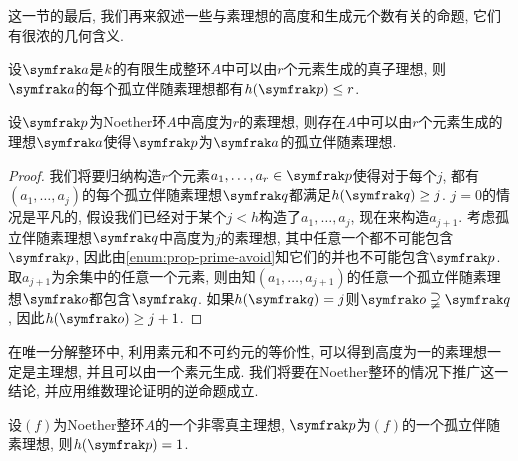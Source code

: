 
这一节的最后, 我们再来叙述一些与素理想的高度和生成元个数有关的命题, 它们有很浓的几何含义.

\begin{propositionnoproof}\label{prop:isolatedprimegenerator2height}
  设$\ideal{a}$是$k$的有限生成整环$A$中可以由$r$个元素生成的真子理想, 则$\ideal{a}$的每个孤立伴随素理想都有$h(\ideal{p})\leq r$.
\end{propositionnoproof}


\begin{proposition}\label{prop:isolatedprimeheight2generator}
  设$\ideal{p}$为Noether环$A$中高度为$r$的素理想, 则存在$A$中可以由$r$个元素生成的理想$\ideal{a}$使得$\ideal{p}$为$\ideal{a}$的孤立伴随素理想.
\end{proposition}

\begin{proof}
  我们将要归纳构造$r$个元素$a_1, \dotsc, a_r\in\ideal{p}$使得对于每个$j$, 都有$(a_1, \dotsc, a_j)$的每个孤立伴随素理想$\ideal{q}$都满足$h(\ideal{q})\geq j$. $j=0$的情况是平凡的, 假设我们已经对于某个$j<h$构造了$a_1, \dotsc, a_{j}$, 现在来构造$a_{j+1}$. 考虑孤立伴随素理想$\ideal{q}$中高度为$j$的素理想, 其中任意一个都不可能包含$\ideal{p}$, 因此由\ref{enum:prop-prime-avoid}知它们的并也不可能包含$\ideal{p}$. 取$a_{j+1}$为余集中的任意一个元素, 则由知$(a_1, \dotsc, a_{j+1})$的任意一个孤立伴随素理想$\ideal{o}$都包含$\ideal{q}$. 如果$h(\ideal{q})=j$则$\ideal{o}\supsetneqq \ideal{q}$, 因此$h(\ideal{o})\geq j+1$.
\end{proof}


在唯一分解整环中, 利用素元和不可约元的等价性, 可以得到高度为一的素理想一定是主理想, 并且可以由一个素元生成. 我们将要在Noether整环的情况下推广这一结论, 并应用维数理论证明的逆命题成立.

\begin{theorem}\label{thm:krullhauptidealsatz}
  设$(f)$为Noether整环$A$的一个非零真主理想, $\ideal{p}$为$(f)$的一个孤立伴随素理想, 则$h(\ideal{p})=1$.
\end{theorem}

